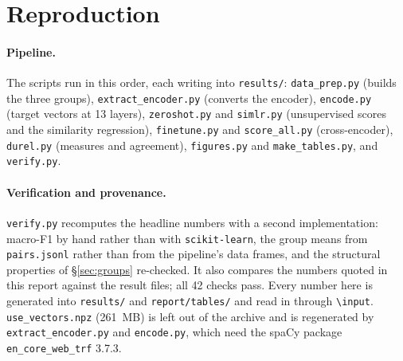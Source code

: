 \documentclass{article}
\newif\iffirstsectiondone
\let\originalsection\section
\renewcommand{\section}{%
  \iffirstsectiondone\Needspace*{0.12\textheight}\else\firstsectiondonetrue\fi
  \originalsection}
\begin{document}
\section{Reproduction}

\paragraph{Pipeline.} The scripts run in this order, each writing into
\texttt{results/}: \texttt{data\_prep.py} (builds the three groups),
\texttt{extract\_encoder.py} (converts the encoder), \texttt{encode.py} (target
vectors at 13 layers), \texttt{zeroshot.py} and \texttt{simlr.py} (unsupervised
scores and the similarity regression), \texttt{finetune.py} and
\texttt{score\_all.py} (cross-encoder), \texttt{durel.py} (measures and
agreement), \texttt{figures.py} and \texttt{make\_tables.py}, and
\texttt{verify.py}.

\paragraph{Verification and provenance.} \texttt{verify.py} recomputes the
headline numbers with a second implementation: macro-F1 by hand rather than with
\texttt{scikit-learn}, the group means from \texttt{pairs.jsonl} rather than from
the pipeline's data frames, and the structural properties of \S\ref{sec:groups}
re-checked. It also compares the numbers quoted in this report against the result
files; all 42 checks pass. Every number here is generated into \texttt{results/}
and \texttt{report/tables/} and read in through \texttt{\textbackslash input}.
\texttt{use\_vectors.npz} (261~MB) is left out of the archive and is regenerated
by \texttt{extract\_encoder.py} and \texttt{encode.py}, which need the spaCy
package \texttt{en\_core\_web\_trf} 3.7.3.
\end{document}
